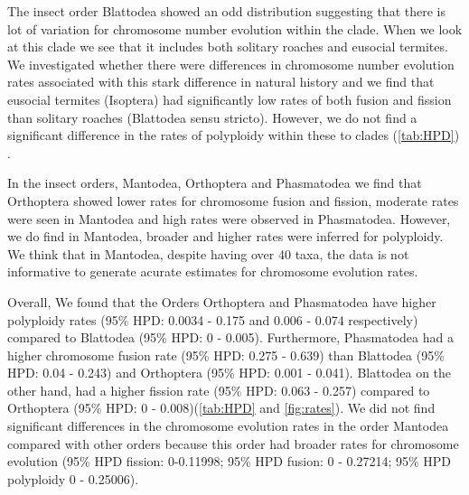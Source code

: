 The insect order Blattodea showed an odd distribution suggesting that there is lot of variation for chromosome number evolution within the clade.
When we look at this clade we see that it includes both solitary roaches and eusocial termites. 
We investigated whether there were differences in chromosome number evolution rates associated with this stark difference in natural history and we find that eusocial termites (Isoptera) had significantly low rates of both fusion and fission than solitary roaches (Blattodea sensu stricto).
However, we do not find a significant difference in the rates of polyploidy within these to clades (\cref{tab:HPD}) .

In the insect orders, Mantodea, Orthoptera and Phasmatodea we find that Orthoptera showed lower rates for chromosome fusion and fission, moderate rates were seen in Mantodea and high rates were observed in Phasmatodea.
However, we do find in Mantodea, broader and higher rates were inferred for polyploidy.
We think that in Mantodea, despite having over 40 taxa, the data is not informative to generate acurate estimates for chromosome evolution rates.

Overall, We found that the Orders Orthoptera and Phasmatodea have higher polyploidy rates (95\% HPD: 0.0034 - 0.175 and 0.006 - 0.074 respectively) compared  to Blattodea (95\% HPD: 0 - 0.005).
Furthermore, Phasmatodea had a higher chromosome fusion rate (95\% HPD: 0.275 - 0.639) than Blattodea (95\% HPD: 0.04 - 0.243) and Orthoptera (95\% HPD: 0.001 - 0.041).
Blattodea on the other hand, had a higher fission rate (95\% HPD: 0.063 - 0.257) compared to Orthoptera (95\% HPD: 0 - 0.008)(\cref{tab:HPD} and \cref{fig:rates}).
We did not find significant differences in the chromosome evolution rates in the order Mantodea compared with other orders because this order had broader rates for chromosome evolution (95\% HPD fission: 0-0.11998; 95\% HPD fusion: 0 - 0.27214; 95\% HPD polyploidy 0 - 0.25006).



